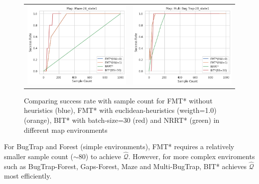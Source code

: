 \documentclass{article}
\begin{document}
\begin{figure}
{\begin{tabular}{cc}
			\includegraphics[scale=0.45]{srVsc_Maze-24_state1.png} & \includegraphics[scale=0.45]{srVsc_Multi Bug Trap-28_state1.png}  \\
		\end{tabular}
	}
	\caption{Comparing success rate with sample count for FMT* without heuristics (blue), FMT* with euclidean-heuristics (weigth=1.0) (orange), BIT* with batch-size=30 (red) and NRRT* (green) in different map environments}
        \label{mets:srVsc}
\end{figure}

For BugTrap and Forest (simple environments), FMT* requires a relatively smaller sample count ($\sim 80$) to achieve $\hat{\mathcal{Q}}$. However, for more complex enviroments such as BugTrap-Forest, Gaps-Forest, Maze and Multi-BugTrap, BIT* achieves $\hat{\mathcal{Q}}$ most efficiently. 
\end{document}
